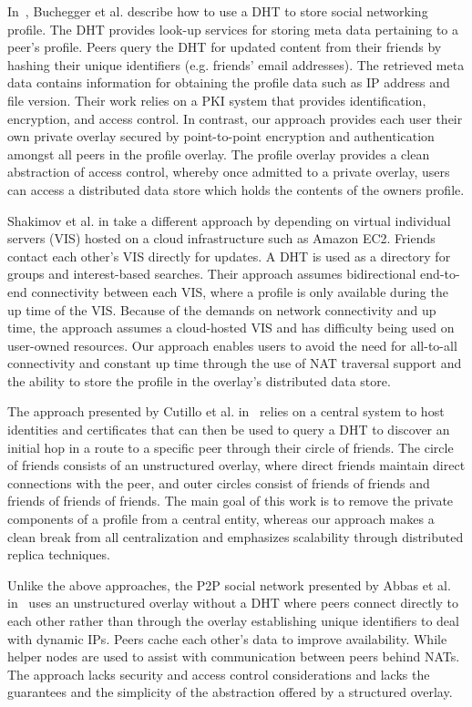 \documentclass[conference]{IEEEtran}
\begin{document}
In~\cite{peerson}, Buchegger et al. describe how to use a DHT to store social
networking profile.  The DHT provides look-up services for storing meta data
pertaining to a peer's profile.  Peers query the DHT for updated content from
their friends by hashing their unique identifiers (e.g. friends' email
addresses).  The retrieved meta data contains information for obtaining the
profile data such as IP address and file version. Their work relies on a PKI
system that provides identification, encryption, and access control.  In
contrast, our approach provides each user their own private overlay secured by
point-to-point encryption and authentication amongst all peers in the profile
overlay.  The profile overlay provides a clean abstraction of access control,
whereby once admitted to a private overlay, users can access a distributed data
store which holds the contents of the owners profile.

Shakimov et al. in \cite{vis-a-vis} take a different approach by depending on
virtual individual servers (VIS) hosted on a cloud infrastructure such as
Amazon EC2. Friends contact each other's VIS directly for updates.  A DHT is
used as a directory for groups and interest-based searches. Their approach
assumes bidirectional end-to-end connectivity between each VIS, where a profile
is only available during the up time of the VIS.  Because of the demands on
network connectivity and up time, the approach assumes a cloud-hosted VIS and
has difficulty being used on user-owned resources.  Our approach enables users
to avoid the need for all-to-all connectivity and constant up time through the
use of NAT traversal support and the ability to store the profile in the
overlay's distributed data store.

The approach presented by Cutillo et al. in~\cite{matryoshka} relies on a
central system to host identities and certificates that can then be used to
query a DHT to discover an initial hop in a route to a specific peer through
their circle of friends.  The circle of friends consists of an unstructured
overlay, where direct friends maintain direct connections with the peer, and
outer circles consist of friends of friends and friends of friends of friends.
The main goal of this work is to remove the private components of a profile
from a central entity, whereas our approach makes a clean break from all
centralization and emphasizes scalability through distributed replica
techniques.

Unlike the above approaches, the P2P social network presented by Abbas et al.
in~\cite{tribler-osn} uses an unstructured overlay without a DHT where peers
connect directly to each other rather than through the overlay establishing
unique identifiers to deal with dynamic IPs.  Peers cache each other's data to
improve availability.  While helper nodes are used to assist with
communication between peers behind NATs.  The approach lacks security and
access control considerations and lacks the guarantees and the simplicity of
the abstraction offered by a structured overlay.
\end{document}
